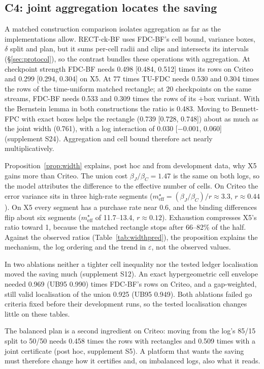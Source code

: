 \documentclass[sigconf,anonymous,review]{acmart}
\newcommand{\eps}{\varepsilon}
\newcommand{\meff}{m_{\text{eff}}}
\begin{document}
\subsection{C4: joint aggregation locates the saving}\label{sec:c4}

A matched construction comparison isolates aggregation as far as the implementations allow. RECT-ck-BF uses FDC-BF's cell bound, variance boxes, $\delta$ split and plan, but it sums per-cell radii and clips and intersects its intervals (\S\ref{sec:protocol}), so the contrast bundles these operations with aggregation. At checkpoint strength FDC-BF needs 0.498 [0.484, 0.512] times its rows on Criteo and 0.299 [0.294, 0.304] on X5. At 77 times TU-FDC needs 0.530 and 0.304 times the rows of the time-uniform matched rectangle; at 20 checkpoints on the same streams, FDC-BF needs 0.533 and 0.309 times the rows of its +box variant. With the Bernstein lemma in both constructions the ratio is 0.483. Moving to Bennett-FPC with exact boxes helps the rectangle (0.739 [0.728, 0.748]) about as much as the joint width (0.761), with a log interaction of 0.030 [$-0.001$, 0.060] (supplement S24). Aggregation and cell bound therefore act nearly multiplicatively.

Proposition~\ref{prop:width} explains, post hoc and from development data, why X5 gains more than Criteo. The union cost $\beta_J/\beta_C = 1.47$ is the same on both logs, so the model attributes the difference to the effective number of cells. On Criteo the error variance sits in three high-rate segments ($\meff^\star = (\beta_J/\beta_C)/r \approx 3.3$, $r \approx 0.44$). On X5 every segment has a purchase rate near 0.6, and the binding differences flip about six segments ($\meff^\star$ of 11.7--13.4, $r \approx 0.12$). Exhaustion compresses X5's ratio toward 1, because the matched rectangle stops after 66--82\% of the half. Against the observed ratios (Table~\ref{tab:widthpred}), the proposition explains the mechanism, the log ordering and the trend in $\eps$, not the observed values.

In two ablations neither a tighter cell inequality nor the tested ledger localisation moved the saving much (supplement S12). An exact hypergeometric cell envelope needed 0.969 (UB95 0.990) times FDC-BF's rows on Criteo, and a gap-weighted, still valid localisation of the union 0.925 (UB95 0.949). Both ablations failed go criteria fixed before their development runs, so the tested localisation changes little on these tables.

The balanced plan is a second ingredient on Criteo: moving from the log's 85/15 split to 50/50 needs 0.458 times the rows with rectangles and 0.509 times with a joint certificate (post hoc, supplement S5). A platform that wants the saving must therefore change how it certifies and, on imbalanced logs, also what it reads.
\end{document}
